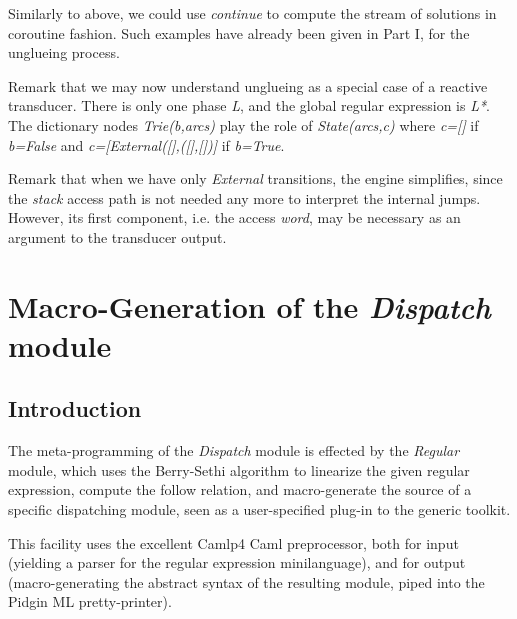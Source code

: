 Similarly to above, we could use {\sl continue} to compute
the stream of solutions in coroutine fashion. Such examples have already
been given in Part I, for the unglueing process.

Remark that we may now understand unglueing as a special case of
a reactive transducer. There is only one phase {\sl L}, and the global regular
expression is {\sl L*}. The dictionary nodes {\sl Trie(b,arcs)} play the 
role of {\sl State(arcs,c)} where {\sl c=[]} if {\sl b=False} and
{\sl c=[External([],([],[])]} if {\sl b=True}.

Remark that when we have only {\sl External} transitions, the engine simplifies,
since the {\sl stack} access path is not needed any more to interpret
the internal jumps. However, its first component, i.e. the access {\sl word},
may be necessary as an argument to the transducer output. 

\section{Macro-Generation of the {\it Dispatch} module}
\label{macro}

\subsection{Introduction} 

The meta-programming of the {\it Dispatch} module is effected by the 
{\sl Regular} module, which uses the Berry-Sethi algorithm to linearize the 
given regular expression, compute the follow relation, and macro-generate the 
source of a specific dispatching module,
seen as a user-specified plug-in to the generic toolkit. 

This facility uses the excellent Camlp4 Caml preprocessor, 
both for input (yielding a parser
for the regular expression minilanguage), and for output 
(macro-generating the abstract syntax
of the resulting module, piped into the Pidgin ML pretty-printer). 

